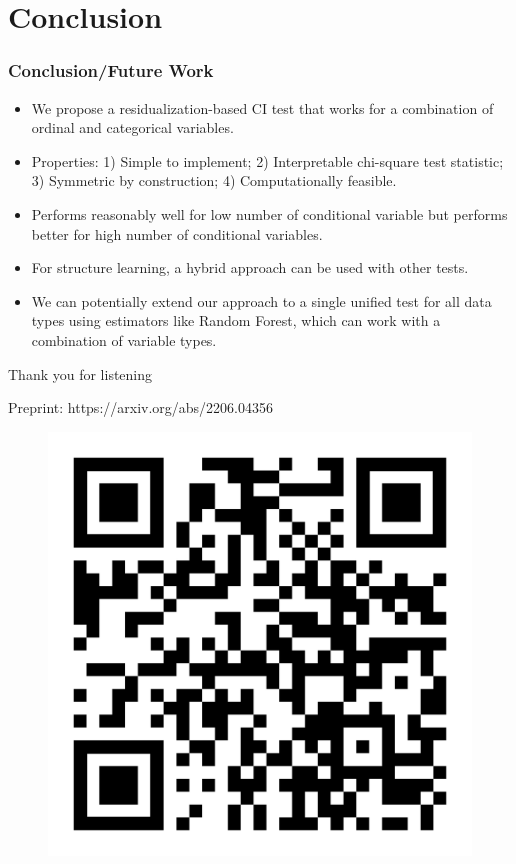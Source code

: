 \documentclass{beamer}
\begin{document}

\section{Conclusion}
\begin{frame}
	\frametitle{Conclusion/Future Work}
	\begin{itemize}
		\setlength\itemsep{1em}
		\item  We propose a residualization-based CI test that works
			for a combination of ordinal and categorical variables.
		\item Properties: 1) Simple to implement; 2) Interpretable
			chi-square test statistic; 3) Symmetric by
			construction; 4) Computationally feasible.
		\item Performs reasonably well for low number of conditional
			variable but performs better for high number of
			conditional variables.
		\item For structure learning, a hybrid approach can be used
			with other tests.
		\item We can potentially extend our approach to a single unified test
			for all data types using estimators like Random Forest, which
			can work with a combination of variable types.
	\end{itemize}
\end{frame}

\begin{frame}
	\begin{center}
		\Huge{Thank you for listening}
	\end{center}
	\begin{center}
		Preprint: https://arxiv.org/abs/2206.04356
		\begin{figure}
			\includegraphics[scale=0.07]{imgs/qr-code.pdf}
		\end{figure}
	\end{center}
\end{frame}
\end{document}
